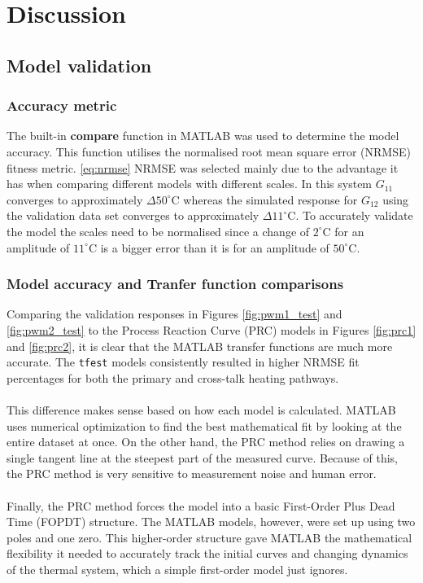 \section{Discussion}
\subsection{Model validation}
\subsubsection{Accuracy metric}
The built-in \textbf{compare} function in MATLAB was used to determine the model accuracy. This function utilises the normalised
root mean square error (NRMSE) fitness metric. \cite{mathworks_compare} \ref{eq:nrmse} NRMSE was selected mainly due to the advantage it has when
comparing different models with different scales.\cite{khoshvaght2025critical} In this system $G_{11}$ converges to approximately $\Delta 50^\circ\text{C}$ whereas
the simulated response for $G_{12}$ using the validation data set converges to approximately $\Delta 11^\circ\text{C}$. To accurately validate the model
the scales need to be normalised since a change of $2^\circ\text{C}$ for an amplitude of $11^\circ\text{C}$ is a  bigger error than it is for an amplitude of $50^\circ\text{C}$.
\subsubsection{Model accuracy and Tranfer function comparisons}
Comparing the validation responses in Figures \ref{fig:pwm1_test} and \ref{fig:pwm2_test} to the Process Reaction Curve (PRC) models in Figures \ref{fig:prc1} and \ref{fig:prc2}, it is clear that the MATLAB transfer functions 
are much more accurate. The \texttt{tfest} models consistently resulted in higher NRMSE fit percentages for both the primary and cross-talk heating pathways.
\\
\\
This difference makes sense based on how each model is calculated. MATLAB uses numerical optimization to find the best mathematical fit by looking at the entire dataset 
at once. On the other hand, the PRC method relies on drawing a single tangent line at the steepest part of the measured curve. Because of this, the PRC method is very sensitive to 
measurement noise and human error.
\\
\\
Finally, the PRC method forces the model into a basic First-Order Plus Dead Time (FOPDT) structure. The MATLAB models, however, were set up using two poles and one zero. This higher-order structure gave 
MATLAB the mathematical flexibility it needed to accurately track the initial curves and changing dynamics of the thermal system, which a simple first-order model just ignores.


